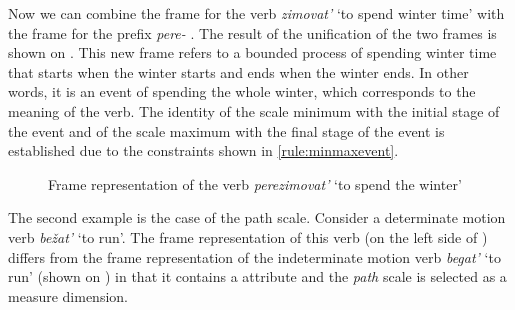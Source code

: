Now we can combine the frame for the verb \textit{zimovat'} `to spend winter time' with the frame for the prefix \textit{pere-}  . The result of the unification of the two frames is shown on . This new frame refers to a bounded process of spending winter time that starts when the winter starts and ends when the winter ends. In other words, it is an event of spending the whole winter, which corresponds to the meaning of the verb. The identity of the scale minimum with the initial stage of the event and of the scale maximum with the final stage of the event is established due to the constraints shown in \ref{rule:minmaxevent}.

\begin{figure}
\centering
{}
\caption{Frame representation of the verb \textit{perezimovat'} `to spend the winter' \label{frame:perezimovat}}
\end{figure}

The second example is the case of the path scale. Consider a determinate motion verb \textit{be\v{z}at'} `to run'. The frame representation of this verb (on the left side of ) differs from the frame representation of the indeterminate motion verb \textit{begat'} `to run' (shown on ) in that it contains a \PATH attribute and the \textit{path} scale is selected as a measure dimension. 

